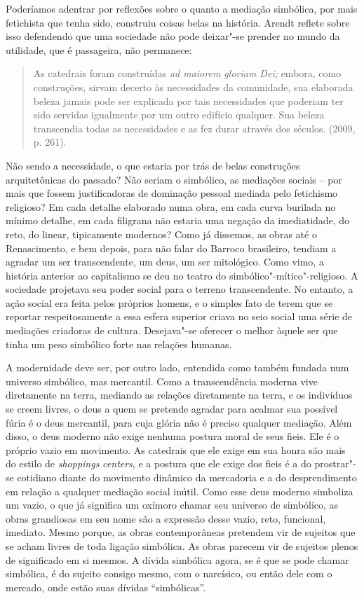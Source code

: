 Poderíamos adentrar por reflexões sobre o quanto a mediação simbólica,
por mais fetichista que tenha sido, construiu coisas belas na história.
Arendt reflete sobre isso defendendo que uma sociedade não pode
deixar"-se prender no mundo da utilidade, que é passageira, não
permanece:

\begin{quote}
As catedrais foram construídas \emph{ad maiorem gloriam Dei;} embora,
como construções, sirvam decerto às necessidades da comunidade, sua
elaborada beleza jamais pode ser explicada por tais necessidades que
poderiam ter sido servidas igualmente por um outro edifício qualquer.
Sua beleza transcendia todas as necessidades e as fez durar através dos
séculos. (2009, p. 261).
\end{quote}

Não sendo a necessidade, o que estaria por trás de belas construções
arquitetônicas do passado? Não seriam o simbólico, as mediações sociais
-- por mais que fossem justificadoras de dominação pessoal mediada pelo
fetichismo religioso? Em cada detalhe elaborado numa obra, em cada curva
burilada no mínimo detalhe, em cada filigrana não estaria uma negação da
imediatidade, do reto, do linear, tipicamente modernos? Como já
dissemos, as obras até o Renascimento, e bem depois, para não falar do
Barroco brasileiro, tendiam a agradar um ser transcendente, um deus, um
ser mitológico. Como vimo, a história anterior ao
capitalismo se deu no teatro do simbólico"-mítico"-religioso. A sociedade
projetava seu poder social para o terreno transcendente. No entanto, a
ação social era feita pelos próprios homens, e o simples fato de terem
que se reportar respeitosamente a essa esfera superior criava no seio
social uma série de mediações criadoras de cultura. Desejava"-se oferecer
o melhor àquele ser que tinha um peso simbólico forte nas relações
humanas.

A modernidade deve ser, por outro lado, entendida como também fundada
num universo simbólico, mas mercantil. Como a transcendência moderna
vive diretamente na terra, mediando as relações diretamente na terra, e
os indivíduos se creem livres, o deus a quem se pretende agradar para
acalmar sua possível fúria é o deus mercantil, para cuja glória não é
preciso qualquer mediação. Além disso, o deus moderno não exige nenhuma
postura moral de seus fieis. Ele é o próprio vazio em movimento. As
catedrais que ele exige em sua honra são mais do estilo de
\emph{shoppings} \emph{centers}, e a postura que ele exige dos fieis é a
 do prostrar"-se cotidiano diante do movimento dinâmico da mercadoria e a do desprendimento em relação a qualquer mediação social inútil. Como
esse deus moderno simboliza um vazio, o que já significa um oxímoro
chamar seu universo de simbólico, as obras grandiosas em seu nome são a
expressão desse vazio, reto, funcional, imediato. Mesmo porque, as obras
contemporâneas pretendem vir de sujeitos que se acham livres de toda
ligação simbólica. As obras parecem vir de sujeitos plenos de
significado em si mesmos. A dívida simbólica agora, se é que se pode
chamar simbólica, é do sujeito consigo mesmo, com o narcísico, ou então
dele com o mercado, onde estão suas dívidas ``simbólicas''.

